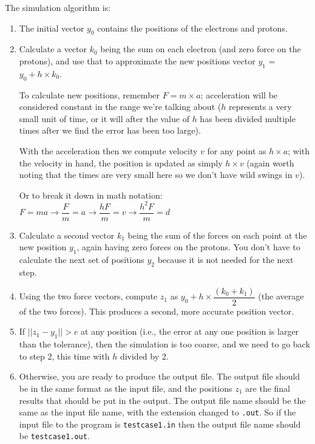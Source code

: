 \documentclass[letterpaper,10pt]{article}
\begin{document}
The simulation algorithm is:

\begin{enumerate}
\item The initial vector $y_{0}$ contains the positions of the electrons and protons.

\item Calculate a vector $k_{0}$ being the sum on each electron (and zero force on the protons), and use that to approximate the new positions vector $y_{1}$ = $y_{0} + h \times k_{0}$.

To calculate new positions, remember $F = m \times a$;  acceleration will be considered constant in the range we're talking about ($h$ represents a very small unit of time, or it will after the value of $h$ has been divided multiple times after we find the error has been too large). 

With the acceleration then we compute velocity $v$ for any point as $h \times a$; with the velocity in hand, the position is updated as simply $h \times v$ (again worth noting that the times are very small here so we don't have wild swings in $v$). 

Or to break it down in math notation: $F = ma \rightarrow \dfrac{F}{m} = a \rightarrow \dfrac{hF}{m} = v \rightarrow \dfrac{h^{2}F}{m} = d$

\item Calculate a second vector $k_{1}$ being the sum of the forces on each point at the new position $y_{1}$, again having zero forces on the protons. You don't have to calculate the next set of positions $y_{2}$ because it is not needed for the next step.

\item Using the two force vectors,  compute $z_{1}$ as $y_{0} + h \times \dfrac{( k_{0} + k_{1} )}{2}$ (the average of the two forces). This produces a second, more accurate position vector.

\item If $||z_{1} - y_{1}|| > e$ at any position (i.e., the error at any one position is larger than the tolerance), then the simulation is too coarse, and we need to go back to step 2, this time with $h$ divided by 2.

\item Otherwise, you are ready to produce the output file. The output file should be in the same format as the input file, and the positions $z_{1}$ are the final results that should be put in the output. The output file name should be the same as the input file name, with the extension changed to \texttt{.out}. So if the input file to the program is \texttt{testcase1.in} then the output file name should be \texttt{testcase1.out}. 

\end{enumerate}
\end{document}

